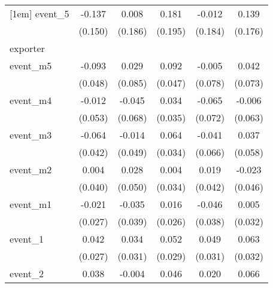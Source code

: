 {\begin{tabular}{l*{5}{c}}
[1em]
event\_5     &      -0.137         &       0.008         &       0.181         &      -0.012         &       0.139         \\
            &     (0.150)         &     (0.186)         &     (0.195)         &     (0.184)         &     (0.176)         \\
\hline
exporter    &                     &                     &                     &                     &                     \\
event\_m5    &      -0.093         &       0.029         &       0.092         &      -0.005         &       0.042         \\
            &     (0.048)         &     (0.085)         &     (0.047)         &     (0.078)         &     (0.073)         \\
[1em]
event\_m4    &      -0.012         &      -0.045         &       0.034         &      -0.065         &      -0.006         \\
            &     (0.053)         &     (0.068)         &     (0.035)         &     (0.072)         &     (0.063)         \\
[1em]
event\_m3    &      -0.064         &      -0.014         &       0.064         &      -0.041         &       0.037         \\
            &     (0.042)         &     (0.049)         &     (0.034)         &     (0.066)         &     (0.058)         \\
[1em]
event\_m2    &       0.004         &       0.028         &       0.004         &       0.019         &      -0.023         \\
            &     (0.040)         &     (0.050)         &     (0.034)         &     (0.042)         &     (0.046)         \\
[1em]
event\_m1    &      -0.021         &      -0.035         &       0.016         &      -0.046         &       0.005         \\
            &     (0.027)         &     (0.039)         &     (0.026)         &     (0.038)         &     (0.032)         \\
[1em]
event\_1     &       0.042         &       0.034         &       0.052         &       0.049         &       0.063\sym{*}  \\
            &     (0.027)         &     (0.031)         &     (0.029)         &     (0.031)         &     (0.032)         \\
[1em]
event\_2     &       0.038         &      -0.004         &       0.046         &       0.020         &       0.066         \\

\end{tabular}}
